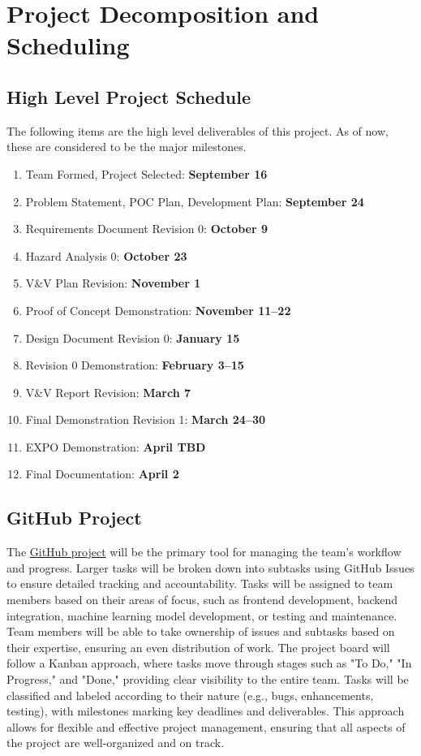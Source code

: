 \documentclass{article}
\begin{document}
\section{Project Decomposition and Scheduling}

\subsection*{High Level Project Schedule}
The following items are the high level deliverables of this project. As of now, these are considered to be the major milestones.

\begin{enumerate}
    \item Team Formed, Project Selected: \hfill\textbf{September 16}
    \item Problem Statement, POC Plan, Development Plan: \hfill\textbf{September 24}
    \item Requirements Document Revision 0: \hfill\textbf{October 9}
    \item Hazard Analysis 0: \hfill\textbf{October 23}
    \item V\&V Plan Revision: \hfill\textbf{November 1}
    \item Proof of Concept Demonstration: \hfill\textbf{November 11--22}
    \item Design Document Revision 0: \hfill\textbf{January 15}
    \item Revision 0 Demonstration: \hfill\textbf{February 3--15}
    \item V\&V Report Revision: \hfill\textbf{March 7}
    \item Final Demonstration Revision 1: \hfill\textbf{March 24--30}
    \item EXPO Demonstration: \hfill\textbf{April TBD}
    \item Final Documentation: \hfill\textbf{April 2}
\end{enumerate}

\subsection*{GitHub Project}
The \href{https://github.com/users/harshc22/projects/2}{GitHub project} will be the primary tool for managing the team’s workflow and progress. Larger tasks will be broken down into subtasks using GitHub Issues to ensure detailed tracking and accountability. Tasks will be assigned to team members based on their areas of focus, such as frontend development, backend integration, machine learning model development, or testing and maintenance. Team members will be able to take ownership of issues and subtasks based on their expertise, ensuring an even distribution of work. The project board will follow a Kanban approach, where tasks move through stages such as "To Do," "In Progress," and "Done," providing clear visibility to the entire team. Tasks will be classified and labeled according to their nature (e.g., bugs, enhancements, testing), with milestones marking key deadlines and deliverables. This approach allows for flexible and effective project management, ensuring that all aspects of the project are well-organized and on track.
\end{document}
